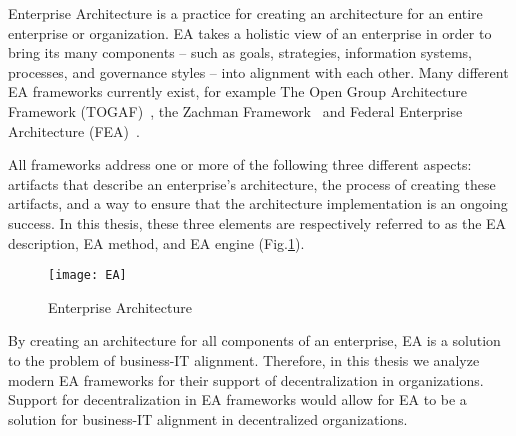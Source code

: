 Enterprise Architecture is a practice for creating an architecture for an entire enterprise or organization. EA takes a holistic view of an enterprise in order to bring its many components -- such as goals, strategies, information systems, processes, and governance styles -- into alignment with each other. Many different EA frameworks currently exist, for example The Open Group Architecture Framework (TOGAF)~\cite{togaf9.1}, the Zachman Framework~\cite{zachman} and Federal Enterprise Architecture (FEA)~\cite{FEA_PMO2007}. 

All frameworks address one or more of the following three different aspects: artifacts that describe an enterprise's architecture, the process of creating these artifacts, and a way to ensure that the architecture implementation is an ongoing success. In this thesis, these three elements are respectively referred to as the EA description, EA method, and EA engine (Fig.\ref{fig:EA_general}). 

\begin{figure}
\centering
\texttt{[image: EA]}
\caption{Enterprise Architecture}
\label{fig:EA_general}
\end{figure}

By creating an architecture for all components of an enterprise, EA is a solution to the problem of business-IT alignment. Therefore, in this thesis we analyze modern EA frameworks for their support of decentralization in organizations. Support for decentralization in EA frameworks would allow for EA to be a solution for business-IT alignment in decentralized organizations. 



